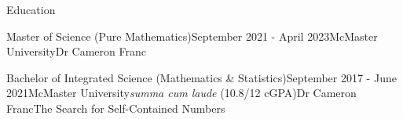 \begin{rSection}{Education}

\begin{edSubsectionFull}{Master of Science (Pure Mathematics)}{September 2021 - April 2023}{McMaster University}{}{Dr Cameron Franc}{}
\end{edSubsectionFull}



\begin{edSubsectionHonours}{Bachelor of Integrated Science (Mathematics \& Statistics)}{September 2017 - June 2021}{McMaster University}{\textit{summa cum laude} (10.8/12 cGPA)}{Dr Cameron Franc}{The Search for Self-Contained Numbers}
\end{edSubsectionHonours}




\end{rSection}